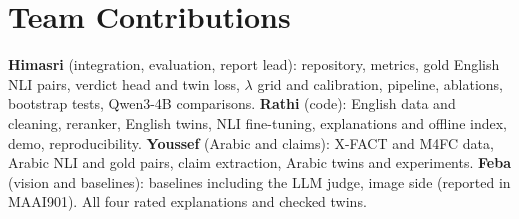 \documentclass[11pt,a4paper]{article}
\begin{document}
\section*{Team Contributions}
\textbf{Himasri} (integration, evaluation, report lead): repository, metrics, gold English NLI pairs, verdict head and twin loss, $\lambda$ grid and calibration, pipeline, ablations, bootstrap tests, Qwen3-4B comparisons. \textbf{Rathi} (code): English data and cleaning, reranker, English twins, NLI fine-tuning, explanations and offline index, demo, reproducibility. \textbf{Youssef} (Arabic and claims): X-FACT and M4FC data, Arabic NLI and gold pairs, claim extraction, Arabic twins and experiments. \textbf{Feba} (vision and baselines): baselines including the LLM judge, image side (reported in MAAI901). All four rated explanations and checked twins.



\end{document}

